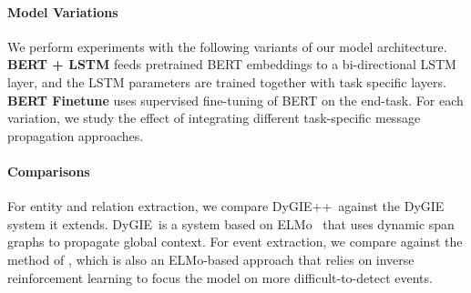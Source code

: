 \documentclass[11pt,a4paper]{article}
\newcommand{\sys}{{\sc DyGIE}}
\newcommand{\ours}{{\sc DyGIE++}}
\begin{document}
\vspace{-.2cm}

\paragraph{Model Variations} We perform experiments with the following  variants of our model architecture. \textbf{BERT + LSTM} feeds pretrained BERT embeddings to a bi-directional LSTM  layer, and the LSTM parameters are  trained together with task specific layers.  
\textbf{BERT Finetune} uses supervised fine-tuning of BERT on the end-task. 
For each variation, we study the effect of integrating different task-specific message propagation approaches.  
\vspace{-.2cm}

\paragraph{Comparisons} For entity and relation extraction, we compare \ours\ against the \sys~ system it extends. \sys\ is a system based on ELMo~\citep{peters2018deep} that uses dynamic span graphs to propagate global context. 
For event extraction, we compare against the method of , which is also an ELMo-based approach that relies on inverse reinforcement learning to focus the model on more difficult-to-detect events. 
\end{document}

